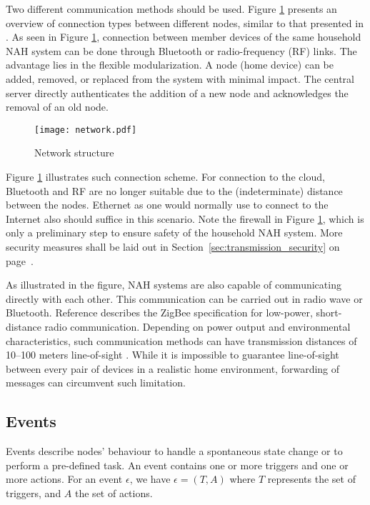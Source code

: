 \documentclass[letterpaper, twocolumn, 10pt, conference]{IEEEtran}
\begin{document}
Two different communication methods should be used. Figure \ref{fig:nah_network} presents an overview of connection types between different nodes, similar to that presented in \cite{petrov2018home}. As seen in Figure \ref{fig:nah_network}, connection between member devices of the same household NAH system can be done through Bluetooth or radio-frequency (RF) links. The advantage lies in the flexible modularization. A node (home device) can be added, removed, or replaced from the system with minimal impact. The central server directly authenticates the addition of a new node and acknowledges the removal of an old node. 

\begin{figure}[!h]
	\texttt{[image: network.pdf]}
	\caption{Network structure}
	\centering
	\label{fig:nah_network}
\end{figure}

Figure \ref{fig:nah_network} illustrates such connection scheme. For connection to the cloud, Bluetooth and RF are no longer suitable due to the (indeterminate) distance between the nodes. Ethernet as one would normally use to connect to the Internet also should suffice in this scenario. Note the firewall in Figure \ref{fig:nah_network}, which is only a preliminary step to ensure safety of the household NAH system. More security measures shall be laid out in Section~\ref{sec:transmission_security} on page~\pageref{sec:transmission_security}.

As illustrated in the figure, NAH systems are also capable of communicating directly with each other. This communication can be carried out in radio wave or Bluetooth. Reference \cite{wang2016zigbee} describes the ZigBee specification for low-power, short-distance radio communication. Depending on power output and environmental characteristics, such communication methods can have transmission distances of 10--100 meters line-of-sight \cite{zigbee2013}. While it is impossible to guarantee line-of-sight between every pair of devices in a realistic home environment, forwarding of messages can circumvent such limitation.

\subsection{Events} \label{ssec:events}

Events describe nodes' behaviour to handle a spontaneous state change or to perform a pre-defined task. An event contains one or more triggers and one or more actions. For an event $ \epsilon $, we have $ \epsilon = (T, A) $ where $ T $ represents the set of triggers, and $ A $ the set of actions.
\end{document}
